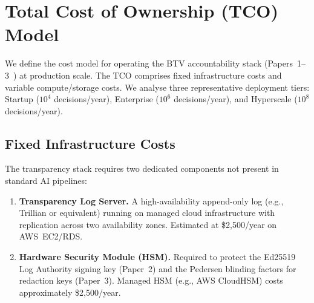 %

\section{Total Cost of Ownership (TCO) Model}
\label{sec:tco}

We define the cost model for operating the BTV accountability stack
(Papers~1--3~\cite{btv2026,btv-t-repo,btv-ar2026}) at production scale.
The TCO comprises fixed infrastructure costs and variable compute/storage
costs. We analyse three representative deployment tiers: Startup
($10^4$ decisions/year), Enterprise ($10^6$ decisions/year), and
Hyperscale ($10^8$ decisions/year).

\subsection{Fixed Infrastructure Costs}
\label{subsec:fixed}

The transparency stack requires two dedicated components not present in
standard AI pipelines:

\begin{enumerate}
  \item \textbf{Transparency Log Server.} A high-availability
  append-only log (e.g., Trillian or equivalent) running on managed
  cloud infrastructure with replication across two availability zones.
  Estimated at \$2{,}500/year on AWS~EC2/RDS.

  \item \textbf{Hardware Security Module (HSM).} Required to protect
  the Ed25519 Log Authority signing key (Paper~2) and the Pedersen
  blinding factors for redaction keys (Paper~3). Managed HSM
  (e.g., AWS CloudHSM) costs approximately \$2{,}500/year.
\end{enumerate}

